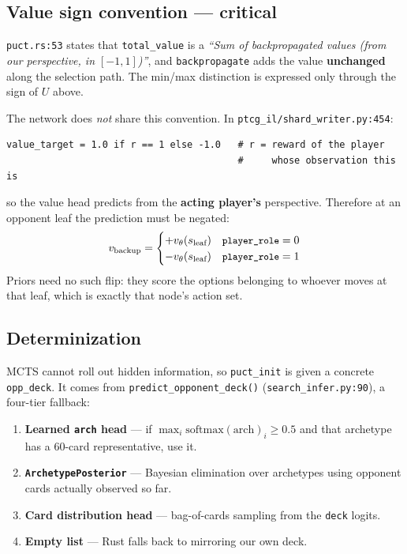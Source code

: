\documentclass[11pt,a4paper]{article}
\newcommand{\code}[1]{\texttt{\small #1}}
\newcommand{\file}[1]{\texttt{\small #1}}
\begin{document}
\subsection{Value sign convention --- critical}
\label{sec:sign}

\code{puct.rs:53} states that \code{total\_value} is a
\emph{``Sum of backpropagated values (from our perspective, in $[-1,1]$)''},
and \code{backpropagate} adds the value \textbf{unchanged} along the selection
path. The min/max distinction is expressed only through the sign of $U$ above.

The network does \emph{not} share this convention. In
\file{ptcg\_il/shard\_writer.py:454}:
\begin{lstlisting}
value_target = 1.0 if r == 1 else -1.0   # r = reward of the player
                                         #     whose observation this is
\end{lstlisting}
so the value head predicts from the \textbf{acting player's} perspective.
Therefore at an opponent leaf the prediction must be negated:
\begin{equation*}
v_{\text{backup}} =
\begin{cases}
+v_\theta(s_{\text{leaf}}) & \text{\code{player\_role}} = 0 \\
-v_\theta(s_{\text{leaf}}) & \text{\code{player\_role}} = 1
\end{cases}
\end{equation*}
Priors need no such flip: they score the options belonging to whoever moves at
that leaf, which is exactly that node's action set.

\subsection{Determinization}

MCTS cannot roll out hidden information, so \code{puct\_init} is given a
concrete \code{opp\_deck}. It comes from \code{predict\_opponent\_deck()}
(\file{search\_infer.py:90}), a four-tier fallback:

\begin{enumerate}[leftmargin=*]
  \item \textbf{Learned \code{arch} head} --- if $\max_i \text{softmax}(\text{arch})_i \ge 0.5$
    and that archetype has a $60$-card representative, use it.
  \item \textbf{\code{ArchetypePosterior}} --- Bayesian elimination over
    archetypes using opponent cards actually observed so far.
  \item \textbf{Card distribution head} --- bag-of-cards sampling from the
    \code{deck} logits.
  \item \textbf{Empty list} --- Rust falls back to mirroring our own deck.
\end{enumerate}
\end{document}
